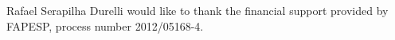 Rafael Serapilha Durelli would like to thank the financial support provided by FAPESP, process number 2012/05168-4.